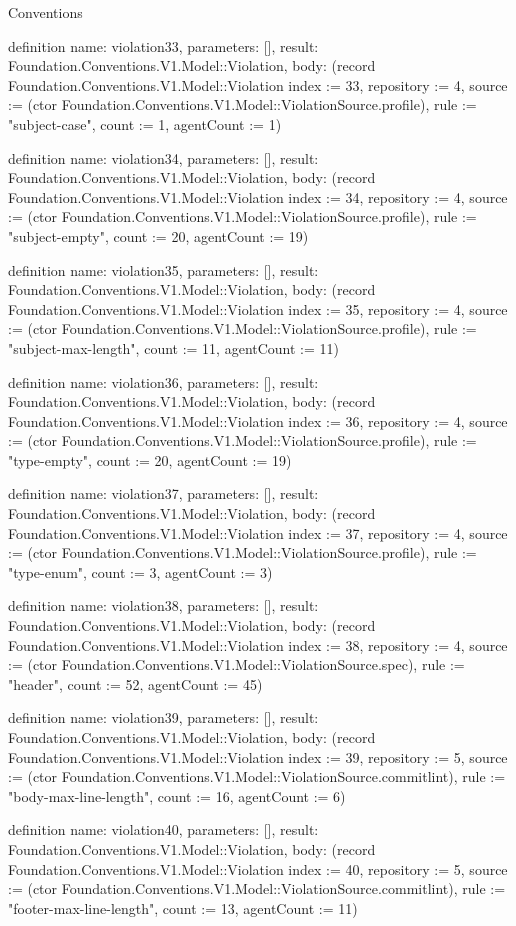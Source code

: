 \begin{lexlean}{Conventions}
\begin{semanticmodule}
definition{
  name: violation33,
  parameters: [],
  result: Foundation.Conventions.V1.Model::Violation,
  body: (record Foundation.Conventions.V1.Model::Violation {index := 33, repository := 4, source := (ctor Foundation.Conventions.V1.Model::ViolationSource.profile), rule := "subject-case", count := 1, agentCount := 1})
}

definition{
  name: violation34,
  parameters: [],
  result: Foundation.Conventions.V1.Model::Violation,
  body: (record Foundation.Conventions.V1.Model::Violation {index := 34, repository := 4, source := (ctor Foundation.Conventions.V1.Model::ViolationSource.profile), rule := "subject-empty", count := 20, agentCount := 19})
}

definition{
  name: violation35,
  parameters: [],
  result: Foundation.Conventions.V1.Model::Violation,
  body: (record Foundation.Conventions.V1.Model::Violation {index := 35, repository := 4, source := (ctor Foundation.Conventions.V1.Model::ViolationSource.profile), rule := "subject-max-length", count := 11, agentCount := 11})
}

definition{
  name: violation36,
  parameters: [],
  result: Foundation.Conventions.V1.Model::Violation,
  body: (record Foundation.Conventions.V1.Model::Violation {index := 36, repository := 4, source := (ctor Foundation.Conventions.V1.Model::ViolationSource.profile), rule := "type-empty", count := 20, agentCount := 19})
}

definition{
  name: violation37,
  parameters: [],
  result: Foundation.Conventions.V1.Model::Violation,
  body: (record Foundation.Conventions.V1.Model::Violation {index := 37, repository := 4, source := (ctor Foundation.Conventions.V1.Model::ViolationSource.profile), rule := "type-enum", count := 3, agentCount := 3})
}

definition{
  name: violation38,
  parameters: [],
  result: Foundation.Conventions.V1.Model::Violation,
  body: (record Foundation.Conventions.V1.Model::Violation {index := 38, repository := 4, source := (ctor Foundation.Conventions.V1.Model::ViolationSource.spec), rule := "header", count := 52, agentCount := 45})
}

definition{
  name: violation39,
  parameters: [],
  result: Foundation.Conventions.V1.Model::Violation,
  body: (record Foundation.Conventions.V1.Model::Violation {index := 39, repository := 5, source := (ctor Foundation.Conventions.V1.Model::ViolationSource.commitlint), rule := "body-max-line-length", count := 16, agentCount := 6})
}

definition{
  name: violation40,
  parameters: [],
  result: Foundation.Conventions.V1.Model::Violation,
  body: (record Foundation.Conventions.V1.Model::Violation {index := 40, repository := 5, source := (ctor Foundation.Conventions.V1.Model::ViolationSource.commitlint), rule := "footer-max-line-length", count := 13, agentCount := 11})
}


\end{semanticmodule}
\end{lexlean}
